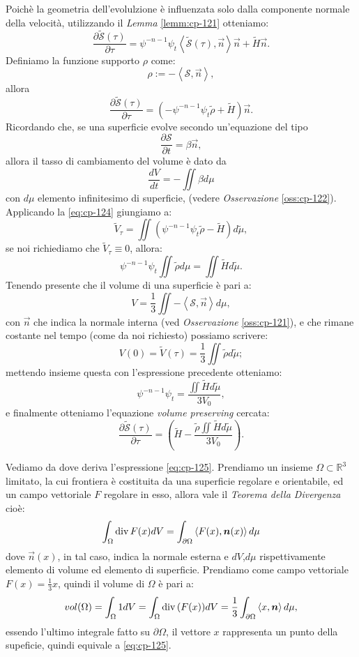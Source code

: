 Poichè la geometria dell'evolulzione è influenzata solo dalla componente normale della velocità, utilizzando il \emph{Lemma} \ref{lemm:cp-121} otteniamo:
\[
\frac{\partial\mathcal{\tilde{S}}(\tau)}{\partial\tau}=\psi^{-n-1}\psi_t\left<\mathcal{\tilde{S}}(\tau),\vec{n}\right>\vec{n}+\tilde{H}\vec{n}.
\]
Definiamo la funzione supporto $\rho$ come:
\[
\rho:=-\left<\mathcal{S},\vec{n}\right>,
\]
allora
\[
\frac{\partial\mathcal{\tilde{S}}(\tau)}{\partial\tau}=\left(-\psi^{-n-1}\psi_t\tilde{\rho}+\tilde{H}\right)\vec{n}.
\]
Ricordando che, se una superficie evolve secondo un'equazione del tipo
\[
\frac{\partial \mathcal{S}}{\partial t}=\beta\vec{n},
\]
allora il tasso di cambiamento del volume è dato da
\begin{equation}
\label{eq:cp-124}
\frac{d V}{d t}=-\iint\beta d\mu
\end{equation}
con $d\mu$ elemento infinitesimo di superficie, (vedere
\emph{Osservazione} \ref{oss:cp-122}).  Applicando la \eqref{eq:cp-124}
giungiamo a: 
\[
\tilde{V}_{\tau}=\iint(\psi^{-n-1}\psi_t\tilde{\rho}-\tilde{H})d\tilde{\mu},
\]
se noi richiediamo che $\tilde{V}_{\tau}\equiv 0$, allora:
\[
\psi^{-n-1}\psi_t\iint\tilde{\rho}d\mu = \iint\tilde{H}d\tilde{\mu}.
\]
 Tenendo presente che il volume di una superficie è pari a:
\begin{equation}
  \label{eq:cp-125}
V=\frac{1}{3}\iint-\left<\mathcal{S},\vec{n}\right>d\mu,
\end{equation}
con $\vec{n}$ che indica la normale interna (ved \emph{Osservazione} \ref{oss:cp-121}), e che rimane costante nel tempo (come da noi richiesto) possiamo scrivere:
\[
V(0)=\tilde{V}(\tau)=\frac{1}{3}\iint\tilde{\rho}d\tilde{\mu};
\]
mettendo insieme questa con l'espressione precedente otteniamo:
\[
\psi^{-n-1}\psi_t=\frac{\iint\tilde{H}d\tilde{\mu}}{3V_0},
\]
e finalmente otteniamo l'equazione \emph{volume preserving} cercata:
\begin{equation}
\label{eq:cp-126}
\frac{\partial\mathcal{\tilde{S}}(\tau)}{\partial\tau}=\left(\tilde{H}-\frac{\tilde{\rho}\iint\tilde{H}d\tilde{\mu}}{3V_0}\right).
\end{equation}
\begin{osservazione}
\label{oss:cp-121}
Vediamo da dove deriva l'espressione \eqref{eq:cp-125}. Prendiamo un insieme $\Omega\subset\mathbb{R}^3$ limitato, la cui frontiera è costituita da una superficie regolare e orientabile, ed un campo vettoriale $F$ regolare in esso, allora vale il \emph{Teorema della Divergenza} cioè:
\[
\int_{\Omega}\operatorname{div}{F(x)}dV =\int_{\partial\Omega}\left<F(x),\bm{n}(x)\right>d\mu
\]
dove $\vec{n}(x)$, in tal caso, indica la normale esterna e $dV$,$d\mu$ rispettivamente elemento di volume ed elemento di superficie. Prendiamo come campo vettoriale $F(x)=\frac{1}{3}x$, quindi il volume di $\Omega$ è pari a:
\[
vol(\Omega)=\int_{\Omega}1dV=\int_{\Omega}\operatorname{div}{(F(x))}dV=\frac{1}{3}\int_{\partial\Omega}\left<x,\bm{n}\right>d\mu,
\]
essendo l'ultimo integrale fatto su $\partial\Omega$, il vettore $x$ rappresenta un punto della supeficie, quindi equivale a \eqref{eq:cp-125}.
\end{osservazione}

